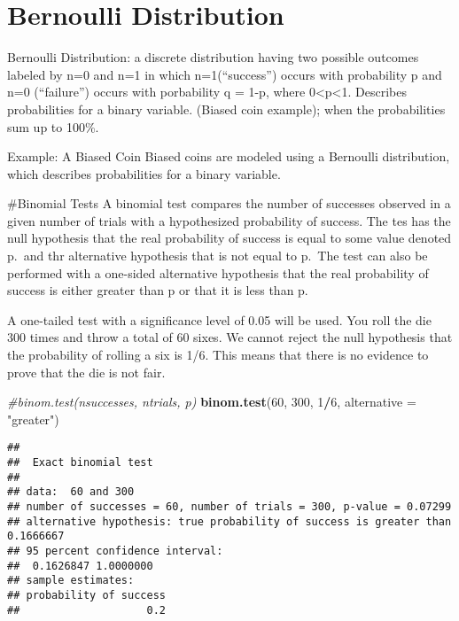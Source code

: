 \documentclass[]{article}
\newenvironment{Shaded}{\begin{snugshade}}{\end{snugshade}}
\newcommand{\CommentTok}[1]{\textcolor[rgb]{0.56,0.35,0.01}{\textit{#1}}}
\newcommand{\DataTypeTok}[1]{\textcolor[rgb]{0.13,0.29,0.53}{#1}}
\newcommand{\DecValTok}[1]{\textcolor[rgb]{0.00,0.00,0.81}{#1}}
\newcommand{\KeywordTok}[1]{\textcolor[rgb]{0.13,0.29,0.53}{\textbf{#1}}}
\newcommand{\NormalTok}[1]{#1}
\newcommand{\OperatorTok}[1]{\textcolor[rgb]{0.81,0.36,0.00}{\textbf{#1}}}
\newcommand{\StringTok}[1]{\textcolor[rgb]{0.31,0.60,0.02}{#1}}
\begin{document}
\hypertarget{bernoulli-distribution}{%
\section{Bernoulli Distribution}\label{bernoulli-distribution}}

Bernoulli Distribution: a discrete distribution having two possible
outcomes labeled by n=0 and n=1 in which n=1(``success'') occurs with
probability p and n=0 (``failure'') occurs with porbability q = 1-p,
where 0\textless{}p\textless{}1. Describes probabilities for a binary
variable. (Biased coin example); when the probabilities sum up to 100\%.

Example: A Biased Coin Biased coins are modeled using a Bernoulli
distribution, which describes probabilities for a binary variable.

\#Binomial Tests A binomial test compares the number of successes
observed in a given number of trials with a hypothesized probability of
success. The tes has the null hypothesis that the real probability of
success is equal to some value denoted p.~and thr alternative hypothesis
that is not equal to p.~The test can also be performed with a one-sided
alternative hypothesis that the real probability of success is either
greater than p or that it is less than p.

A one-tailed test with a significance level of 0.05 will be used. You
roll the die 300 times and throw a total of 60 sixes. We cannot reject
the null hypothesis that the probability of rolling a six is 1/6. This
means that there is no evidence to prove that the die is not fair.

\begin{Shaded}
\begin{Highlighting}[]
\CommentTok{#binom.test(nsuccesses, ntrials, p)}
\KeywordTok{binom.test}\NormalTok{(}\DecValTok{60}\NormalTok{, }\DecValTok{300}\NormalTok{, }\DecValTok{1}\OperatorTok{/}\DecValTok{6}\NormalTok{, }\DataTypeTok{alternative =} \StringTok{"greater"}\NormalTok{)}
\end{Highlighting}
\end{Shaded}

\begin{verbatim}
## 
##  Exact binomial test
## 
## data:  60 and 300
## number of successes = 60, number of trials = 300, p-value = 0.07299
## alternative hypothesis: true probability of success is greater than 0.1666667
## 95 percent confidence interval:
##  0.1626847 1.0000000
## sample estimates:
## probability of success 
##                    0.2
\end{verbatim}
\end{document}
